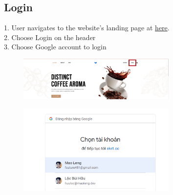 \subsection{Login}
1. User navigates to the website's landing page at \href{https://coffee.skrt.cc}{here}. \\
2. Choose Login on the header \\
3. Choose Google account to login \\ 
\begin{figure}[H]
    \centering
    \includegraphics[width=0.7\textwidth]{Demo/Screenshot_2.png} 
    \label{fig:supportpage}
\end{figure}
\begin{figure}[H]
    \centering
    \includegraphics[width=0.7\textwidth]{Demo/Screenshot_3.png}
    \label{fig:supportpage}
\end{figure}

